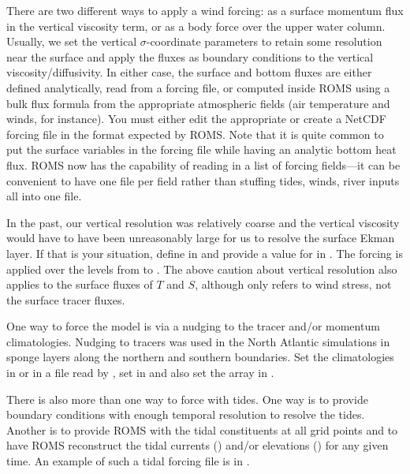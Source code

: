 There are two different ways to apply a wind forcing: as a surface
momentum flux in the vertical viscosity term, or as a body force over
the upper water column.
Usually, we set the vertical $\sigma$-coordinate
parameters to retain some resolution near the surface and apply the
fluxes as boundary conditions to the vertical viscosity/diffusivity.
In either case, the surface and bottom fluxes are either defined
analytically, read from a forcing file, or computed inside ROMS
using a bulk flux formula from the appropriate atmospheric fields
(air temperature and winds, for instance).  You must either edit the
appropriate  or create a NetCDF forcing
file in the format expected by ROMS. Note that it is quite common
to put the surface variables in the forcing file while having an analytic
bottom heat flux. ROMS now has the capability of reading in a list
of forcing fields---it can be convenient to have one file per field
rather than stuffing tides, winds, river inputs all into one file.

In the past, our vertical resolution was relatively coarse and the
vertical viscosity would have to have been unreasonably large for
us to resolve the surface Ekman layer.  If that is your situation,
define  in  and provide a value for
 in .  The forcing is applied over the
levels from  to .  The above caution about
vertical resolution also applies to the surface fluxes of $T$ and
$S$, although  only refers to wind stress, not the
surface tracer fluxes.

\smallskip
{}

One way to force the model is via a nudging to the tracer and/or
momentum climatologies. Nudging to tracers was used in the North
Atlantic simulations in sponge layers along the northern and southern
boundaries. Set the climatologies in  or in a
file read by , set  in
 and also set the array  in
.

\smallskip
{}

There is also more than one way to force with tides. One way is to
provide boundary conditions with enough temporal resolution to
resolve the tides. Another is to provide ROMS with the tidal
constituents at all grid points and to have ROMS reconstruct the
tidal currents ()  and/or elevations ()
for any given time. An example of such a tidal forcing file is in
.

